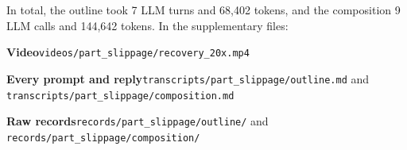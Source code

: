 \documentclass[preprint,12pt,authoryear]{elsarticle}
\let\code\nolinkurl
\begin{document}
In total, the outline took 7 LLM turns and 68,402 tokens, and the composition 9 LLM calls and
144,642 tokens. In the supplementary files:

{\footnotesize\raggedright
\textbf{Video}\enspace \code{videos/part_slippage/recovery_20x.mp4}\par
\textbf{Every prompt and reply}\enspace \code{transcripts/part_slippage/outline.md} and
\code{transcripts/part_slippage/composition.md}\par
\textbf{Raw records}\enspace \code{records/part_slippage/outline/} and
\code{records/part_slippage/composition/}\par}
\end{document}
